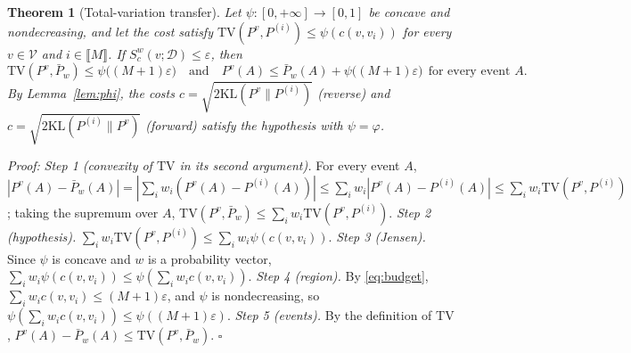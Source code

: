 \documentclass{article}
\newcommand{\cV}{\mathcal{V}}                       %
\newcommand{\cD}{\mathcal{D}}                       %
\newcommand{\Pv}[1]{P^{#1}}                         %
\newcommand{\Pbar}{\bar{P}}                         %
\newcommand{\TV}{\mathrm{TV}}
\newcommand{\KL}{\mathrm{KL}}
\theoremstyle{plain}
\newtheorem{theorem}{Theorem}
\begin{document}
\begin{theorem}[Total-variation transfer]\label{th:tv}
Let $\psi:[0,+\infty]\to[0,1]$ be concave and nondecreasing, and let the cost satisfy
$\TV(\Pv{v},P^{(i)})\leq\psi(c(v,v_i))$ for every $v\in\cV$ and $i\in\llbracket M\rrbracket$. If
$S^w_c(v;\cD)\leq\varepsilon$, then
\[
  \TV(\Pv{v},\Pbar_w)\leq\psi\big((M+1)\varepsilon\big)
  \quad\text{and}\quad
  \Pv{v}(A)\leq\Pbar_w(A)+\psi\big((M+1)\varepsilon\big)\ \ \text{for every event }A.
\]
By Lemma~\ref{lem:phi}, the costs $c=\sqrt{2\KL(\Pv{v}\|P^{(i)})}$ (reverse) and
$c=\sqrt{2\KL(P^{(i)}\|\Pv{v})}$ (forward) satisfy the hypothesis with $\psi=\varphi$.
\end{theorem}
\textit{Proof:}
\emph{Step 1 (convexity of $\TV$ in its second argument).} For every event $A$,
$|\Pv{v}(A)-\Pbar_w(A)|=|\sum_iw_i(\Pv{v}(A)-P^{(i)}(A))|\leq\sum_iw_i|\Pv{v}(A)-P^{(i)}(A)|\leq\sum_iw_i\TV(\Pv{v},P^{(i)})$;
taking the supremum over $A$, $\TV(\Pv{v},\Pbar_w)\leq\sum_iw_i\TV(\Pv{v},P^{(i)})$.
\emph{Step 2 (hypothesis).} $\sum_iw_i\TV(\Pv{v},P^{(i)})\leq\sum_iw_i\psi(c(v,v_i))$.
\emph{Step 3 (Jensen).} Since $\psi$ is concave and $w$ is a probability vector,
$\sum_iw_i\psi(c(v,v_i))\leq\psi(\sum_iw_ic(v,v_i))$.
\emph{Step 4 (region).} By \eqref{eq:budget}, $\sum_iw_ic(v,v_i)\leq(M+1)\varepsilon$, and $\psi$ is
nondecreasing, so $\psi(\sum_iw_ic(v,v_i))\leq\psi((M+1)\varepsilon)$.
\emph{Step 5 (events).} By the definition of $\TV$,
$\Pv{v}(A)-\Pbar_w(A)\leq\TV(\Pv{v},\Pbar_w)$. \hfill $\square$
\end{document}
